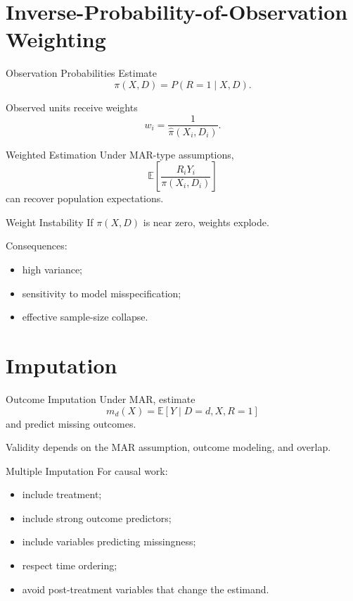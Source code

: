 \documentclass[aspectratio=169,11pt]{beamer}
\newcommand{\E}{\mathbb{E}}
\begin{document}
\section{Inverse-Probability-of-Observation Weighting}

\begin{frame}{Observation Probabilities}
Estimate
\[
\pi(X,D)=P(R=1\mid X,D).
\]

Observed units receive weights
\[
w_i=\frac{1}{\widehat\pi(X_i,D_i)}.
\]
\end{frame}

\begin{frame}{Weighted Estimation}
Under MAR-type assumptions,
\[
\E\left[
\frac{R_iY_i}{\pi(X_i,D_i)}
\right]
\]
can recover population expectations.
\end{frame}

\begin{frame}{Weight Instability}
If \(\pi(X,D)\) is near zero, weights explode.

Consequences:
\begin{itemize}
\item high variance;
\item sensitivity to model misspecification;
\item effective sample-size collapse.
\end{itemize}
\end{frame}

\section{Imputation}

\begin{frame}{Outcome Imputation}
Under MAR, estimate
\[
m_d(X)=\E[Y\mid D=d,X,R=1]
\]
and predict missing outcomes.

Validity depends on the MAR assumption, outcome modeling, and overlap.
\end{frame}

\begin{frame}{Multiple Imputation}
For causal work:
\begin{itemize}
\item include treatment;
\item include strong outcome predictors;
\item include variables predicting missingness;
\item respect time ordering;
\item avoid post-treatment variables that change the estimand.
\end{itemize}
\end{frame}
\end{document}
